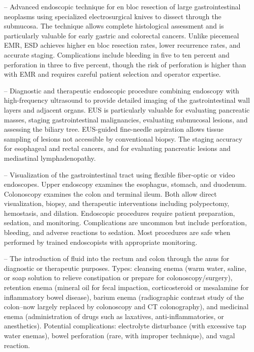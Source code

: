 -- Advanced endoscopic technique for en bloc resection of large gastrointestinal neoplasms using specialized electrosurgical knives to dissect through the submucosa. The technique allows complete histological assessment and is particularly valuable for early gastric and colorectal cancers. Unlike piecemeal EMR, ESD achieves higher en bloc resection rates, lower recurrence rates, and accurate staging. Complications include bleeding in five to ten percent and perforation in three to five percent, though the risk of perforation is higher than with EMR and requires careful patient selection and operator expertise.

-- Diagnostic and therapeutic endoscopic procedure combining endoscopy with high-frequency ultrasound to provide detailed imaging of the gastrointestinal wall layers and adjacent organs. EUS is particularly valuable for evaluating pancreatic masses, staging gastrointestinal malignancies, evaluating submucosal lesions, and assessing the biliary tree. EUS-guided fine-needle aspiration allows tissue sampling of lesions not accessible by conventional biopsy. The staging accuracy for esophageal and rectal cancers, and for evaluating pancreatic lesions and mediastinal lymphadenopathy.

-- Visualization of the gastrointestinal tract using flexible fiber-optic or video endoscopes. Upper endoscopy examines the esophagus, stomach, and duodenum. Colonoscopy examines the colon and terminal ileum. Both allow direct visualization, biopsy, and therapeutic interventions including polypectomy, hemostasis, and dilation. Endoscopic procedures require patient preparation, sedation, and monitoring. Complications are uncommon but include perforation, bleeding, and adverse reactions to sedation. Most procedures are safe when performed by trained endoscopists with appropriate monitoring.

-- The introduction of fluid into the rectum and colon through the anus for diagnostic or therapeutic purposes. Types: cleansing enema (warm water, saline, or soap solution to relieve constipation or prepare for colonoscopy/surgery), retention enema (mineral oil for fecal impaction, corticosteroid or mesalamine for inflammatory bowel disease), barium enema (radiographic contrast study of the colon--now largely replaced by colonoscopy and CT colonography), and medicinal enema (administration of drugs such as laxatives, anti-inflammatories, or anesthetics). Potential complications: electrolyte disturbance (with excessive tap water enemas), bowel perforation (rare, with improper technique), and vagal reaction.

